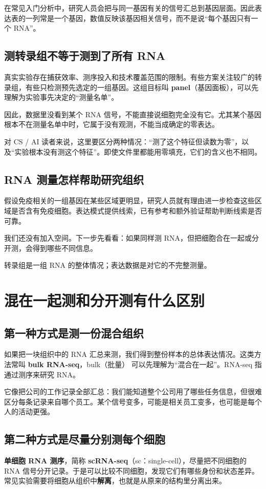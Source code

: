 \documentclass[UTF8,a4paper,11pt,fontset=fandol]{ctexart}
\newcommand{\term}[2]{{\color{accent}\textbf{#1}}（#2）}
\newcommand{\takeaway}[1]{\begin{tcolorbox}[learningstyle,title=本章要记住]#1\end{tcolorbox}}
\newcommand{\chapterstart}[1]{\clearpage\section{#1}}
\begin{document}
在常见入门分析中，研究人员会把与同一基因有关的信号汇总到基因层面。因此表达表的一列常是一个基因，数值反映该基因相关信号，而不是说“每个基因只有一个 RNA”。

\subsection{测转录组不等于测到了所有 RNA}
真实实验存在捕获效率、测序投入和技术覆盖范围的限制。有些方案关注较广的转录组，有些只检测预先选定的一组基因。这组目标叫 \term{panel}{基因面板}，可以先理解为实验事先决定的“测量名单”。

因此，数据里没看到某个 RNA 信号，不能直接说细胞完全没有它。尤其某个基因根本不在测量名单中时，它属于没有观测，不能当成确定的零表达。

对 CS / AI 读者来说，这里要区分两种情况：“测了这个特征但读数为零”，以及“实验根本没有测这个特征”。即使文件里都能用零填充，它们的含义也不相同。

\subsection{RNA 测量怎样帮助研究组织}
假设免疫相关的一组基因在某些区域更明显，研究人员就有理由进一步检查这些区域是否含有免疫细胞。表达模式提供线索，已有参考和额外验证帮助判断线索是否可靠。

我们还没有加入空间。下一步先看看：如果同样测 RNA，但把细胞合在一起或分开测，会得到哪些不同信息。

\takeaway{转录组是一组 RNA 的整体情况；表达数据是对它的不完整测量。}

\chapterstart{混在一起测和分开测有什么区别}
\subsection{第一种方式是测一份混合组织}
如果把一块组织中的 RNA 汇总来测，我们得到整份样本的总体表达情况。这类方法常叫 \textbf{bulk RNA-seq}，bulk（批量） 可以先理解为“混合在一起”。RNA-seq 指通过测序来研究 RNA。\cite{nhgri-rnaseq}

它像把公司的工作记录全部汇总：我们能知道整个公司用了哪些任务信息，但很难区分每条记录来自哪个员工。某个信号变多，可能是相关员工变多，也可能是每个人的活动更强。

\subsection{第二种方式是尽量分别测每个细胞}
\textbf{单细胞 RNA 测序}，简称 \textbf{scRNA-seq}（sc：single-cell），尽量把不同细胞的 RNA 信号分开记录。于是可以比较不同细胞，发现它们有哪些身份和状态差异。常见实验需要将细胞从组织中\textbf{解离}，也就是从原来的结构里分离出来。
\end{document}
